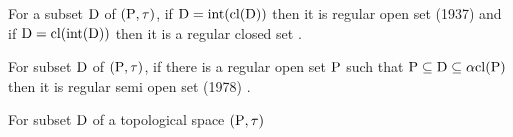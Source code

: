 \begin{dfn}\label{dfn1.2.5}
For a subset $\mathrm{D}$ of $(\mathrm{P}, \tau)$, if $\mathrm{D} = \mbox{int} (\mathrm{cl}(\mathrm{D}))$ then it is regular open set (1937) and if $\mathrm{D} = \mathrm{cl}(\mbox{int}(\mathrm{D}))$ then it is a regular closed set \cite{Long}.
\end{dfn}

\begin{dfn}\label{dfn1.2.6}
For subset $\mathrm{D}$ of $(\mathrm{P}, \tau)$, if there is a regular open set $\mathrm{P}$ such that $\mathrm{P} \subseteq \mathrm{D} \subseteq \alpha \mathrm{cl}(\mathrm{P})$ then it is regular semi open set (1978) \cite{Cameron}. 
\end{dfn}

\begin{dfn}\label{dfn1.2.7}
For subset $\mathrm{D}$ of a topological space $(\mathrm{P}, \tau)$ 
\end{dfn}


